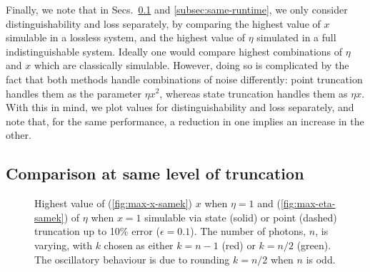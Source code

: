 Finally, we note that in Secs.\ \ref{subsec:same-k} and \ref{subsec:same-runtime}, we only consider distinguishability and loss separately, by comparing the highest value of $x$ simulable in a lossless system, and the highest value of $\eta$ simulated in a full indistinguishable system. 
Ideally one would compare highest combinations of $\eta$ and $x$ which are classically simulable. 
However, doing so is complicated by the fact that both methods handle combinations of noise differently: point truncation handles them as the parameter $\eta x^2$, whereas state truncation handles them as $\eta x$. 
With this in mind, we plot values for distinguishability and loss separately, and note that, for the same performance, a reduction in one implies an increase in the other.


\subsection{Comparison at same level of truncation}
\label{subsec:same-k}

\begin{figure}
\hfill
{}
\caption[Highest value of (\ref{fig:max-x-samek}) $x$ and $\eta$ simulable via state or point truncation]{\label{fig:samek} 
Highest value of (\ref{fig:max-x-samek}) $x$ when $\eta=1$ and (\ref{fig:max-eta-samek}) of $\eta$ when $x=1$ simulable via state (solid) or point (dashed) truncation up to 10\% error ($\epsilon=0.1$). 
The number of photons, $n$, is varying, with $k$ chosen as either $k=n-1$ (red) or $k=n/2$ (green).
The oscillatory behaviour is due to rounding $k=n/2$ when $n$ is odd.}
\end{figure}

